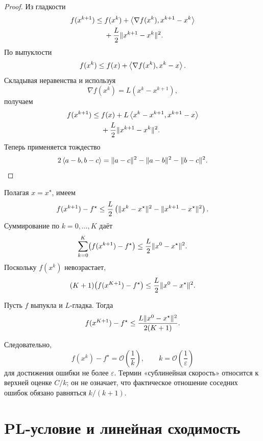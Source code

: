 \begin{proof}
Из гладкости
\[
\begin{aligned}
    f(x^{k+1})
    \le{}&
    f(x^k)
    +
    \left\langle \nabla f(x^k),x^{k+1}-x^k \right\rangle
    \\
    &+
    \frac L2\lVert x^{k+1}-x^k\rVert^2.
\end{aligned}
\]
По выпуклости
\[
    f(x^k)
    \le
    f(x)
    +
    \left\langle \nabla f(x^k),x^k-x \right\rangle.
\]
Складывая неравенства и используя
\[
    \nabla f(x^k)=L(x^k-x^{k+1}),
\]
получаем
\[
\begin{aligned}
    f(x^{k+1})
    \le{}&
    f(x)
    +
    L\left\langle x^k-x^{k+1},x^{k+1}-x \right\rangle
    \\
    &+
    \frac L2\lVert x^{k+1}-x^k\rVert^2.
\end{aligned}
\]
Теперь применяется тождество
\[
    2\left\langle a-b,b-c \right\rangle
    =
    \lVert a-c\rVert^2
    -
    \lVert a-b\rVert^2
    -
    \lVert b-c\rVert^2.
\]
\end{proof}

Полагая \(x=x^\star\), имеем
\[
\begin{aligned}
    f(x^{k+1})-f^\star
    \le
    \frac L2
    \left(
        \lVert x^k-x^\star\rVert^2
        -
        \lVert x^{k+1}-x^\star\rVert^2
    \right).
\end{aligned}
\]
Суммирование по \(k=0,\ldots,K\) даёт
\[
    \sum_{k=0}^{K}
    \bigl(f(x^{k+1})-f^\star\bigr)
    \le
    \frac L2\lVert x^0-x^\star\rVert^2.
\]
Поскольку \(f(x^k)\) невозрастает,
\[
\begin{aligned}
    (K+1)
    \bigl(f(x^{K+1})-f^\star\bigr)
    \le
    \frac L2\lVert x^0-x^\star\rVert^2.
\end{aligned}
\]

\begin{theorem}
Пусть \(f\) выпукла и \(L\)-гладка. Тогда
\[
    f(x^{K+1})-f^\star
    \le
    \frac{L\lVert x^0-x^\star\rVert^2}{2(K+1)}.
\]
\end{theorem}

Следовательно,
\[
    f(x^k)-f^\star
    =
    \mathcal O\!\left(\frac1k\right),
    \qquad
    k
    =
    \mathcal O\!\left(\frac1\varepsilon\right)
\]
для достижения ошибки не более \(\varepsilon\). Термин
«сублинейная скорость» относится к верхней оценке \(C/k\); он не
означает, что фактическое отношение соседних ошибок обязано равняться
\(k/(k+1)\).

\section{PL-условие и линейная сходимость}

